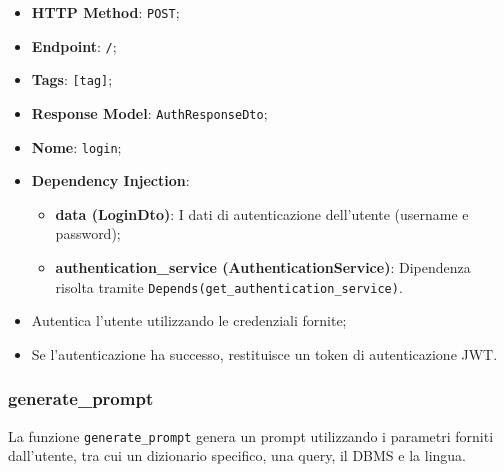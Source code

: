\begin{itemize}
\item \textbf{HTTP Method}: \texttt{POST};
\item \textbf{Endpoint}: \texttt{/};
\item \textbf{Tags}: \texttt{[tag]};
\item \textbf{Response Model}: \texttt{AuthResponseDto};
\item \textbf{Nome}: \texttt{login};
\item \textbf{Dependency Injection}:
\begin{itemize}
\item \textbf{data (LoginDto)}: I dati di autenticazione dell'utente (username e password);
\item \textbf{authentication\_service (AuthenticationService)}: Dipendenza risolta tramite \texttt{Depends(get\_authentication\_service)}.
\end{itemize}
\end{itemize}

\begin{itemize}
\item Autentica l'utente utilizzando le credenziali fornite;
\item Se l'autenticazione ha successo, restituisce un token di autenticazione JWT.
\end{itemize}



\subsubsection{generate\_prompt}

\par La funzione \texttt{generate\_prompt} genera un prompt utilizzando i parametri forniti dall'utente, tra cui un dizionario specifico, una query, il DBMS e la lingua.

